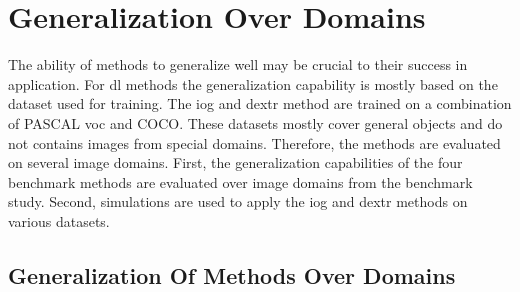 
\section{Generalization Over Domains} \label{ord:ch5:sec2}

The ability of methods to generalize well may be crucial to their success in application.
For \gls{dl} methods the generalization capability is mostly based on the dataset used for training.
The \gls{iog} and \gls{dextr} method are trained on a combination of PASCAL \gls{voc} and COCO.
These datasets mostly cover general objects and do not contains images from special domains.
Therefore, the methods are evaluated on several image domains.
First, the generalization capabilities of the four benchmark methods are evaluated over image domains from the benchmark study.
Second, simulations are used to apply the \gls{iog} and \gls{dextr} methods on various datasets.

\subsection{Generalization Of Methods Over Domains}

